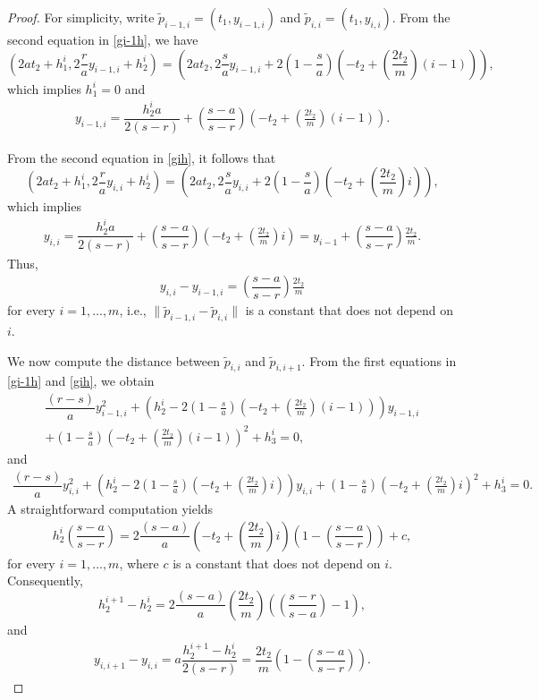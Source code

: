 \documentclass[11pt]{article}
\theoremstyle{definition} %
\begin{document}
\begin{proof}
For simplicity, write $\tilde{p}_{i-1,i}= (t_1, y_{i-1,i})$ and $\tilde{p}_{i,i}= (t_1, y_{i,i})$. From the second equation in \eqref{gi-1h}, we have
$$\left(2at_2+h_1^i, 2\frac{r}{a}y_{i-1,i}+h_2^i\right)=\left(2at_2, 2\frac{s}{a}y_{i-1,i}+2\left(1-\frac{s}{a}\right)\left(-t_2+\left(\frac{2t_2}{m}\right)(i-1)\right)\right),$$
which implies $h_1^i=0$ and 
\begin{align*}
    y_{i-1,i}= \dfrac{h_2^i a}{2\left(s-r\right)}+\left(\dfrac{s-a}{s-r}\right)\left(-t_2+\left(\frac{2t_2}{m}\right)(i-1)\right).
\end{align*}



From the second equation in \eqref{gih}, it follows that 
$$\left(2at_2+h_1^i, 2\frac{r}{a}y_{i,i}+h_2^i\right)=\left(2at_2, 2\frac{s}{a}y_{i,i}+2\left(1-\frac{s}{a}\right)\left(-t_2+\left(\frac{2t_2}{m}\right)i\right)\right),$$
which implies
\begin{align*}
    y_{i,i}= \dfrac{h_2^i a}{2\left(s-r\right)}+\left(\dfrac{s-a}{s-r}\right)\left(-t_2+\left(\frac{2t_2}{m}\right)i\right)= y_{i-1}+\left(\dfrac{s-a}{s-r}\right)\frac{2t_2}{m}.
\end{align*}
Thus,
\begin{align}\label{yiyi-1}
    y_{i,i}-y_{i-1,i}=\left(\dfrac{s-a}{s-r}\right)\frac{2t_2}{m}
\end{align}
for every $i=1,\dots, m$, i.e., $\|\tilde{p}_{i-1,i}-\tilde{p}_{i,i}\|$ is a constant that does not depend on $i$.


We now compute the distance between $\tilde{p}_{i,i}$ and $\tilde{p}_{i,i+1}$. From the first equations in \eqref{gi-1h} and \eqref{gih}, we obtain
\begin{multline*}
    \dfrac{(r-s)}{a}y_{i-1,i}^2 +\left(h_2^i-2\left(1-\frac{s}{a}\right)\left(-t_2+\left(\frac{2t_2}{m}\right)(i-1)\right)\right)y_{i-1,i}\\
    +\left(1-\frac{s}{a}\right)\left(-t_2+\left(\frac{2t_2}{m}\right)(i-1)\right)^2+h_3^i=0,
\end{multline*}
and
\begin{align*}
    \dfrac{(r-s)}{a}y_{i,i}^2 +\left(h_2^i-2\left(1-\frac{s}{a}\right)\left(-t_2+\left(\frac{2t_2}{m}\right)i\right)\right)y_{i,i} +\left(1-\frac{s}{a}\right)\left(-t_2+\left(\frac{2t_2}{m}\right)i\right)^2+h_3^i=0.
\end{align*}
A straightforward computation yields
\begin{align*}
    h_2^i\left(\dfrac{s-a}{s-r}\right)=2\dfrac{(s-a)}{a}\left(-t_2+\left(\dfrac{2t_2}{m}\right)i\right)\left(1-\left(\dfrac{s-a}{s-r}\right)\right)+c,
\end{align*}
for every $i=1,\dots,m$, where $c$ is a constant that does not depend on $i$. Consequently,
$$h_2^{i+1}-h_2^{i}= 2\dfrac{(s-a)}{a} \left(\dfrac{2t_2}{m}\right)\left(\left(\dfrac{s-r}{s-a}\right)-1\right),$$
and
\begin{align}\label{yiyi+1}
y_{i,i+1}-    y_{i,i}=a\dfrac{h_2^{i+1}-h_2^{i}}{2(s-r)}=\dfrac{2t_2}{m}\left(1-\left(\dfrac{s-a}{s-r}\right)\right).
\end{align}




\end{proof}
\end{document}
